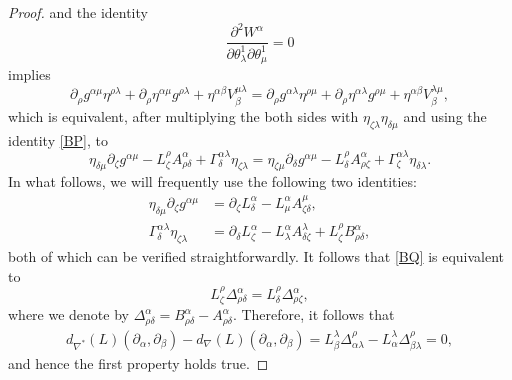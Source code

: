 \documentclass[10pt,a4paper]{amsart}
\newcommand{\Qd}{\Delta}
\newcommand{\Qg}{\Gamma}
\newcommand{\qa}{\alpha}
\newcommand{\qb}{\beta}
\newcommand{\qd}{\delta}
\newcommand{\ql}{\lambda}
\newcommand{\qp}{\partial}
\newcommand{\qth}{\theta}
\newcommand{\qz}{\zeta}
\begin{document}
\begin{proof}
and the identity 
\[
\frac{\qp^2 W^\qa}{\qp\qth_\ql^1\qp\qth_\mu^1} = 0
\]
implies 
\begin{equation*}
\qp_\rho g^{\qa\mu}\eta^{\rho\ql}+\qp_\rho\eta^{\qa\mu}g^{\rho\ql}+\eta^{\qa\qb}V^{\mu\ql}_\qb = 
\qp_\rho g^{\qa\ql}\eta^{\rho\mu}+\qp_\rho \eta^{\qa\ql}g^{\rho\mu}+\eta^{\qa\qb}V^{\ql\mu}_\qb,
\end{equation*}
which is equivalent, after multiplying the both sides with $\eta_{\qz\ql}\eta_{\qd\mu}$ and using the identity \eqref{BP}, to 
\begin{equation}
    \label{BQ}
\eta_{\qd\mu}\qp_\qz g^{\qa\mu}-L^\rho_\qz A^\qa_{\rho\qd}+\Qg^{\qa\ql}_\qd\eta_{\qz\ql} = \eta_{\qz\mu}\qp_\qd g^{\qa\mu}-L^\rho_\qd A^\qa_{\rho\qz}+\Qg^{\qa\ql}_\qz\eta_{\qd\ql}. 
\end{equation}
In what follows, we will frequently use the following two identities:
\begin{align}
  \label{DA}
\eta_{\qd\mu}\qp_\qz g^{\qa\mu}&=\qp_\qz L^\qa_\qd - L^\qa_\mu A^\mu_{\qz\qd},\\
\label{DB}
\Qg^{\qa\ql}_\qd\eta_{\qz\ql}&=\qp_\qd L^\qa_\qz-L^\qa_\ql A^\ql_{\qd\qz}+L^\rho_\qz B^\qa_{\rho\qd},
\end{align}
both of which can be verified straightforwardly. It follows that \eqref{BQ} is equivalent to 
\begin{equation}
  \label{BR}
  L^\rho_\qz \Qd^\qa_{\rho\qd} = L^\rho_\qd \Qd^\qa_{\rho\qz}, 
\end{equation}
where we denote by $\Qd^\qa_{\rho\qd} = B^\qa_{\rho\qd}-A^\qa_{\rho\qd}$. Therefore, it follows that 
\begin{align*}
  d_{\nabla^*}(L)(\qp_\qa,\qp_\qb)-d_{\nabla}(L)(\qp_\qa,\qp_\qb) = L^\ql_\qb \Qd^\rho_{\qa\ql}-L^\ql_\qa \Qd^\rho_{\qb\ql} = 0,
\end{align*}
and hence the first property holds true.


\end{proof}
\end{document}
